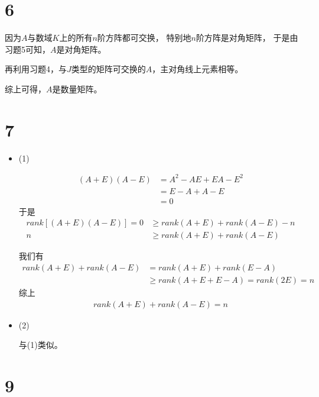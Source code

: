 \documentclass{article}
\begin{document}
\section*{6}

因为$A$与数域$K$上的所有$n$阶方阵都可交换，
特别地$n$阶方阵是对角矩阵，
于是由习题5可知，$A$是对角矩阵。

再利用习题4，与$J$类型的矩阵可交换的$A$，主对角线上元素相等。

综上可得，$A$是数量矩阵。

\section*{7}

\begin{itemize}
  \item (1)

        \begin{align*}
          (A + E) (A - E)
           & = A^2 - AE + EA - E^2 \\
           & = E - A + A - E       \\
           & = 0
        \end{align*}
        于是
        \begin{align*}
          rank[(A + E)(A - E)] = 0 & \geq rank(A + E) + rank(A - E) - n \\
          n                        & \geq rank(A + E) + rank(A - E)
        \end{align*}

        我们有
        \begin{align*}
          rank(A + E) + rank(A - E) & = rank(A + E) + rank(E - A)             \\
                                    & \geq rank(A + E + E - A) = rank(2E) = n
        \end{align*}
        综上
        \begin{align*}
          rank(A + E) + rank(A - E) = n
        \end{align*}

  \item (2)

        与(1)类似。

\end{itemize}

\section*{9}
\end{document}
